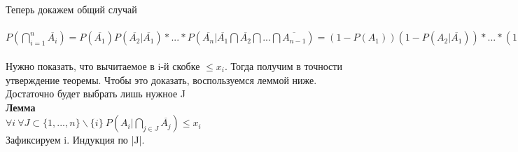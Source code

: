     \EndProof
    \\
    \\
    Теперь докажем общий случай\\
    \Proof
    \\
    $P(\bigcap\limits_{i=1}^n \overline{A_i}) = P(\overline{A_1})P(\overline{A_2}|\overline{A_1})* ... * P(\overline{A_n}| \overline{A_1}\bigcap \overline{A_2} \bigcap...\bigcap \overline{A_{n-1}}) = (1 -P(A_1))(1 - P(A_2|\overline{A_1}))* ... *(1 - P(A_n| \overline{A_1}\bigcap \overline{A_2} \bigcap...\bigcap \overline{A_{n-1}}))$
    \\
    \\
    Нужно показать, что вычитаемое в i-й скобке $\leq x_i$. Тогда получим в точности утверждение теоремы. Чтобы это доказать, воспользуемся леммой ниже. Достаточно будет выбрать лишь нужное J 
    \\
    \textbf{Лемма}
\\
$\forall i \ \forall J \subset \{1,..., n\} \backslash \{i \} \ P(A_i | \bigcap\limits_{j \in J}\overline{A_j}) \leq x_i$\\
\Proof Зафиксируем i. Индукция по |J|.
